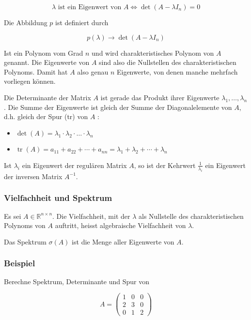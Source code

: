 $$
\lambda \text { ist ein Eigenwert von } A \Leftrightarrow \operatorname{det}\left(A-\lambda I_{n}\right)=0
$$

Die Abbildung $p$ ist definiert durch

$$
p(\lambda) \rightarrow \operatorname{det}\left(A-\lambda I_{n}\right)
$$

Ist ein Polynom vom Grad $n$ und wird charakteristisches Polynom von $A$ genannt. Die Eigenwerte von $A$ sind also die Nullstellen des charakteristischen Polynoms. Damit hat $A$ also genau $n$ Eigenwerte, von denen manche mehrfach vorliegen können.

Die Determinante der Matrix $A$ ist gerade das Produkt ihrer Eigenwerte $\lambda_{1}, \ldots, \lambda_{n}$. Die Summe der Eigenwerte ist gleich der Summe der Diagonalelemente von $A$, d.h. gleich der Spur (tr) von $A$ :

\begin{itemize}
  \item $\operatorname{det}(A)=\lambda_{1} \cdot \lambda_{2} \cdot \ldots \cdot \lambda_{n}$
  \item $\operatorname{tr}(A)=a_{11}+a_{22}+\cdots+a_{n n}=\lambda_{1}+\lambda_{2}+\cdots+\lambda_{n}$
\end{itemize}

Ist $\lambda_{i}$ ein Eigenwert der regulären Matrix $A$, so ist der Kehrwert $\frac{1}{\lambda_{i}}$ ein Eigenwert der inversen Matrix $A^{-1}$.

\subsubsection*{Vielfachheit und Spektrum}
Es sei $A \in \mathbb{R}^{n \times n}$. Die Vielfachheit, mit der $\lambda$ als Nullstelle des charakteristischen Polynoms von $A$ auftritt, heisst algebraische Vielfachheit von $\lambda$.

Das Spektrum $\sigma(A)$ ist die Menge aller Eigenwerte von $A$.

\subsubsection*{Beispiel}
Berechne Spektrum, Determinante und Spur von

$$
A=\left(\begin{array}{lll}
1 & 0 & 0 \\
2 & 3 & 0 \\
0 & 1 & 2
\end{array}\right)
$$

